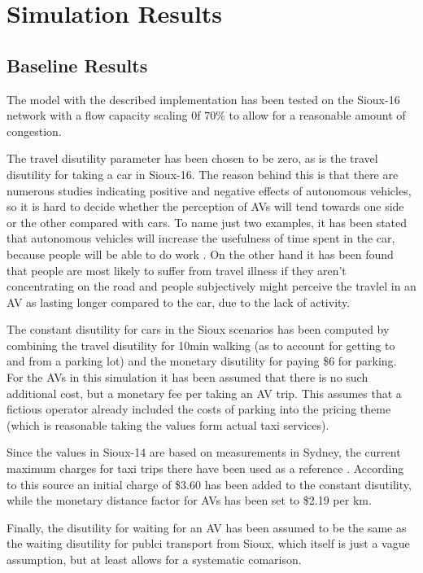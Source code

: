 \section{Simulation Results}

\subsection{Baseline Results}

The model with the described implementation has been tested on the Sioux-16 network
with a flow capacity scaling 0f $70\%$ to allow for a reasonable amount of congestion.

The travel disutility parameter has been chosen to be zero, as is the travel
disutility for taking a car in Sioux-16. The reason behind this is that there are
numerous studies indicating positive and negative effects of autonomous vehicles, so
it is hard to decide whether the perception of AVs will tend towards one side or the
other compared with cars. To name just two examples, it has been stated that autonomous
vehicles will increase the usefulness of time spent in the car, because people will
be able to do work . On the other hand it has been found that people
are most likely to suffer from travel illness if they aren't concentrating on the
road  and people subjectively might perceive the travlel in an AV
as lasting longer compared to the car, due to the lack of activity.

The constant disutility for cars in the Sioux scenarios
has been computed by combining the travel disutility for 10min walking (as to
account for getting to and from a parking lot) and the monetary disutility for
paying \$6 for parking. For the AVs in this simulation it has been assumed that
there is no such additional cost, but a monetary fee per taking an AV trip. This
assumes that a fictious operator already included the costs of parking into the
pricing theme (which is reasonable taking the values form actual taxi services).

Since the values in Sioux-14 are based on measurements in Sydney, the current
maximum charges for taxi trips there have been used as a reference \citep{NSW2016}. According to this
source an initial charge of \$3.60 has been added to the constant disutility, while
the monetary distance factor for AVs has been set to \$2.19 per km.

Finally, the disutility for waiting for an AV has been assumed to be the same as
the waiting disutility for publci transport from Sioux, which itself is just a
vague assumption, but at least allows for a systematic comarison.

